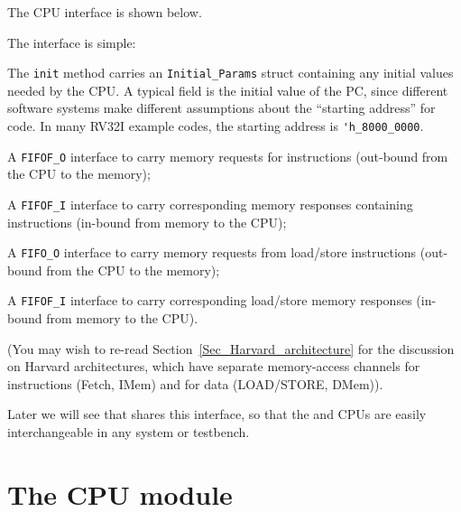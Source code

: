 \label{Sec_Drum_CPU_interface}


The {\DRUM} CPU interface is shown below.


The interface is simple:

\begin{tightlist}

  \item The \verb|init| method carries an \verb|Initial_Params| struct
    containing any initial values needed by the CPU.  A typical field
    is the initial value of the PC, since different software systems
    make different assumptions about the ``starting address'' for
    code.  In many RV32I example codes, the starting address is
    \verb|'h_8000_0000|.

  \item A \verb|FIFOF_O| interface to carry memory requests for
    instructions (out-bound from the CPU to the memory);

  \item A \verb|FIFOF_I| interface to carry corresponding memory
    responses containing instructions (in-bound from memory to the
    CPU);

  \item A \verb|FIFO_O| interface to carry memory requests from
    load/store instructions (out-bound from the CPU to the memory);

  \item A \verb|FIFOF_I| interface to carry corresponding load/store
    memory responses (in-bound from memory to the CPU).

\end{tightlist}

(You may wish to re-read Section~\ref{Sec_Harvard_architecture} for
the discussion on Harvard architectures, which have separate
memory-access channels for instructions (Fetch, IMem) and for data
(LOAD/STORE, DMem)).

Later we will see that {\FIFE} shares this interface, so that the {\FIFE}
and {\DRUM} CPUs are easily interchangeable in any system or testbench.


\section{The {\DRUM} CPU module}

